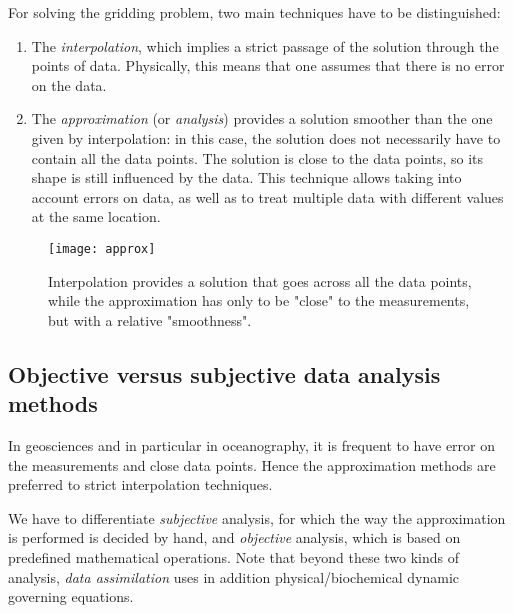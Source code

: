 For solving the gridding problem, two main techniques have to be distinguished:

\begin{enumerate}

\item The \textit{interpolation}, which implies a strict passage of the solution through the points of data. Physically, this means that one assumes that there is no error on the data. 


\item The \textit{approximation} (or \textit{analysis}) provides a solution smoother than the one given by interpolation: in this case, the solution does not necessarily have to contain all the data points. The solution is close to the data points, so its shape is still influenced by the data. This technique allows taking into account errors on data, as well as to treat multiple data with different values at the same location. 
\end{enumerate}

\begin{figure}[htpb]
	\centering
	\parbox{.5\textwidth}{
		\texttt{[image: approx]}
		}\parbox{.5\textwidth}{
		\caption{Interpolation provides a solution that goes across all the data points, while the approximation has only to be "close" to the measurements, but with a relative "smoothness".}
		}
\end{figure}


\subsection{Objective versus subjective data analysis methods\label{sec:gridding}}

In geosciences and in particular in oceanography, it is frequent to have error on the measurements and close data points. Hence the approximation methods are preferred to strict interpolation techniques.

We have to differentiate \textit{subjective} analysis, for which the way the approximation is performed is decided by hand, and \textit{objective} analysis, which is based on predefined mathematical operations. Note that beyond these two kinds of analysis, \textit{data assimilation} uses in addition physical/biochemical dynamic governing equations. 

